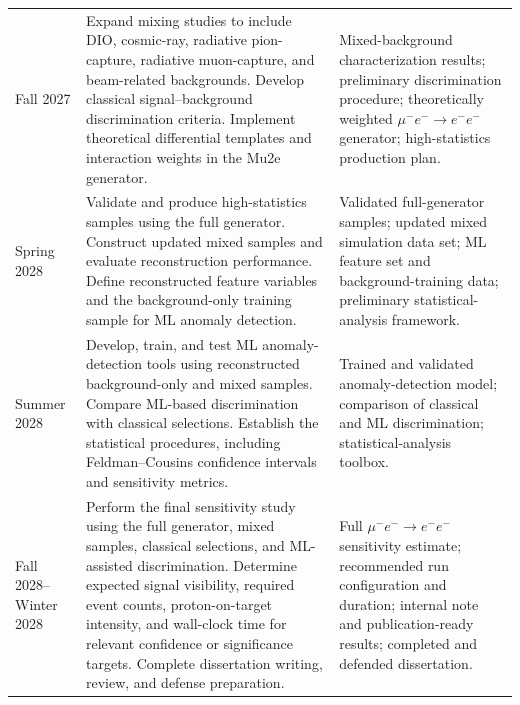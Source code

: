 \documentclass[12pt]{article}
\newcommand{\muEtoEE}{\mu^- e^- \to e^- e^-}
\begin{document}
\begin{landscape}
\begin{table}[p]
\begin{tabular}{p{2.3cm} p{9.8cm} p{9.8cm}}
Fall 2027 &
Expand mixing studies to include DIO, cosmic-ray, radiative pion-capture, radiative muon-capture, and beam-related backgrounds. Develop classical signal--background discrimination criteria. Implement theoretical differential templates and interaction weights in the Mu2e generator. &
Mixed-background characterization results; preliminary discrimination procedure; theoretically weighted \(\muEtoEE\) generator; high-statistics production plan. \\
\addlinespace

Spring 2028 &
Validate and produce high-statistics samples using the full generator. Construct updated mixed samples and evaluate reconstruction performance. Define reconstructed feature variables and the background-only training sample for ML anomaly detection. &
Validated full-generator samples; updated mixed simulation data set; ML feature set and background-training data; preliminary statistical-analysis framework. \\
\addlinespace

Summer 2028 &
Develop, train, and test ML anomaly-detection tools using reconstructed background-only and mixed samples. Compare ML-based discrimination with classical selections. Establish the statistical procedures, including Feldman--Cousins confidence intervals and sensitivity metrics. &
Trained and validated anomaly-detection model; comparison of classical and ML discrimination; statistical-analysis toolbox. \\
\addlinespace

Fall 2028--Winter 2028 &
Perform the final sensitivity study using the full generator, mixed samples, classical selections, and ML-assisted discrimination. Determine expected signal visibility, required event counts, proton-on-target intensity, and wall-clock time for relevant confidence or significance targets. Complete dissertation writing, review, and defense preparation. &
Full \(\muEtoEE\) sensitivity estimate; recommended run configuration and duration; internal note and publication-ready results; completed and defended dissertation. \\
\bottomrule
\end{tabular}
\end{table}
\clearpage
\end{landscape}

\restoregeometry



\end{document}
